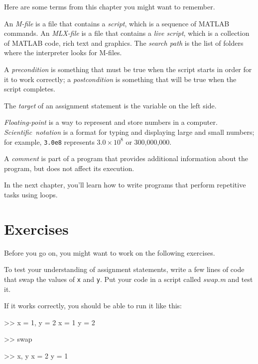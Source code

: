 Here are some terms from this chapter you might want to remember.

An \emph{M-file} is a file that contains a \emph{script}, which is a sequence of MATLAB commands.
An \emph{MLX-file} is a file that contains a \emph{live script}, which is a collection of MATLAB code, rich text and graphics.
The \emph{search path} is the list of folders where the interpreter looks for
M-files.

A \emph{precondition} is something that must be true when the script
starts in order for it to work correctly; a \emph{postcondition} is something that will be true when the script completes.

The \emph{target} of an assignment statement is the variable on the left side.

\emph{Floating-point} is a way to represent and store numbers in a computer.
\mbox{\emph{Scientific notation}} is a format for typing and displaying large
and small numbers; for example, \lstinline{3.0e8} represents $3.0 \times 10^8$
or 300,000,000.

A \emph{comment} is part of a program that provides additional information
about the program, but does not affect its execution.

In the next chapter, you'll learn how to write programs that perform repetitive tasks using loops.


\section{Exercises}

Before you go on, you might want to work on the following exercises.

\begin{ex}
To test your understanding of assignment statements, write a few lines of code that swap the values of \lstinline{x} and \lstinline{y}.
Put your code in a script called \emph{swap.m} and test it.

If it works correctly, you should be able to run it like this:

\begin{code}
>> x = 1, y = 2
x = 1
y = 2

>> swap

>> x, y
x = 2
y = 1
\end{code}
\end{ex}

